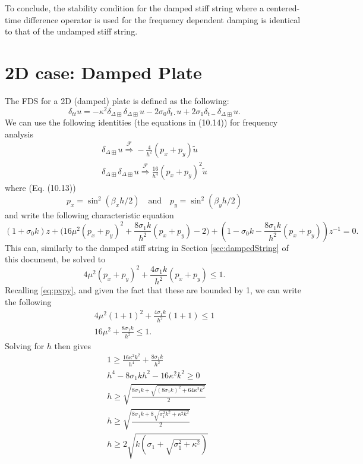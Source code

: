 \documentclass{article}
\begin{document}
To conclude, the stability condition for the damped stiff string where a centered-time difference operator is used for the frequency dependent damping is identical to that of the undamped stiff string.
\section{2D case: Damped Plate}
The FDS for a 2D (damped) plate is defined as the following:
\begin{equation}\label{eq:plateFDS}
    \delta_{tt}u = -\kappa^2\delta_{\Delta\boxplus}\delta_{\Delta\boxplus} u - 2\sigma_0\delta_{t\cdot}u + 2\sigma_1\delta_{t-}\delta_{\Delta\boxplus}u.
\end{equation}
We can use the following identities (the equations in (10.14)) for frequency analysis
\begin{align}
    \delta_{\Delta\boxplus}u \overset{\mathcal{F}}{\Longrightarrow} -\frac{4}{h^2}(p_x + p_y)\tilde{u}\\
    \delta_{\Delta\boxplus}\delta_{\Delta\boxplus}u \overset{\mathcal{F}}{\Longrightarrow} \frac{16}{h^4}(p_x + p_y)^2\tilde{u}
\end{align}
where (Eq. (10.13))
\begin{equation}\label{eq:pxpy}
    p_x = \sin^2(\beta_xh/2) \quad \text{and} \quad p_y = \sin^2(\beta_yh/2)
\end{equation}
and write the following characteristic equation
\begin{equation}
    (1+\sigma_0k)z + \Big(16\mu^2(p_x+p_y)^2 + \frac{8\sigma_1k}{h^2}(p_x+p_y) - 2\Big) + (1 - \sigma_0k - \frac{8\sigma_1k}{h^2}(p_x+p_y))z^{-1} = 0.
\end{equation}
This can, similarly to the damped stiff string in Section \ref{sec:dampedString} of this document, be solved to
\begin{equation}
    4\mu^2(p_x+p_y)^2 + \frac{4\sigma_1k}{h^2}(p_x+p_y) \leq 1.
\end{equation}
Recalling \eqref{eq:pxpy}, and given the fact that these are bounded by 1, we can write the following
\begin{gather}
    4\mu^2(1+1)^2 + \frac{4\sigma_1k}{h^2}(1+1) \leq 1\nonumber\\
    16\mu^2 + \frac{8\sigma_1k}{h^2} \leq 1.
\end{gather}
Solving for $h$ then gives
\begin{align}
    &1 \geq \frac{16\kappa^2k^2}{h^4} + \frac{8\sigma_1k}{h^2}\nonumber\\
    &h^4 - 8\sigma_1kh^2 - 16\kappa^2k^2 \geq 0\nonumber\\
    &h \geq \sqrt{\frac{8\sigma_1k +\sqrt{(8\sigma_1k)^2 + 64\kappa^2k^2}}{2}}\nonumber\\
    &h\geq \sqrt{\frac{8\sigma_1k+8\sqrt{\sigma_1^2k^2+\kappa^2k^2}}{2}}\nonumber\\
    &h \geq 2\sqrt{k\left(\sigma_1 + \sqrt{\sigma_1^2 + \kappa^2}\right)}
\end{align}
\end{document}
